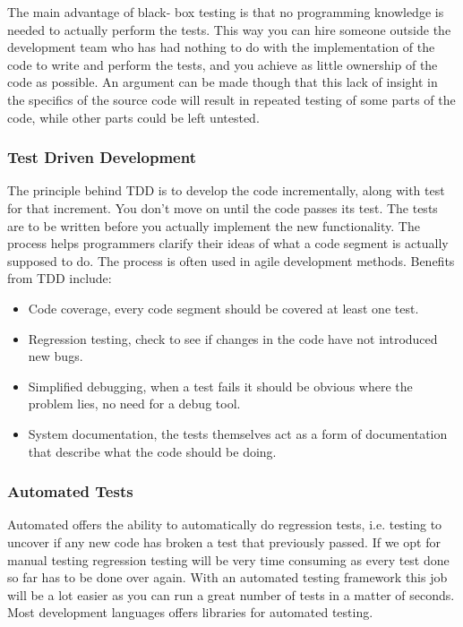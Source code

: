 The main advantage of black- box testing is that no programming knowledge is needed to actually perform the tests. This way you can hire someone outside the development team who has had nothing to do with the implementation of the code to write and perform the tests, and you achieve as little ownership of the code as possible. An argument can be made though that this lack of insight in the specifics of the source code will result in repeated testing of some parts of the code, while other parts could be left untested.

\subsubsection{Test Driven Development}
The principle behind TDD is to develop the code incrementally, along with test for that increment. You don’t move on until the code passes its test. The tests are to be written before you actually implement the new functionality. The process helps programmers clarify their ideas of what a code segment is actually supposed to do. The process is often used in agile development methods.
Benefits from TDD include: 
\begin{itemize}

\item Code coverage, every code segment should be covered at least one test.

\item Regression testing, check to see if changes in the code have not introduced new bugs.

\item Simplified debugging, when a test fails it should be obvious where the problem lies, no need for a debug tool.

\item System documentation, the tests themselves act as a form of documentation that describe what the code should be doing.

\end{itemize}

\subsubsection{Automated Tests}
Automated offers the ability to automatically do regression tests, i.e. testing to uncover if any new code has broken a test that previously passed. If we opt for manual testing regression testing will be very time consuming as every test done so far has to be done over again. With an automated testing framework this job will be a lot easier as you can run a great number of tests in a matter of seconds. Most development languages offers libraries for automated testing.


